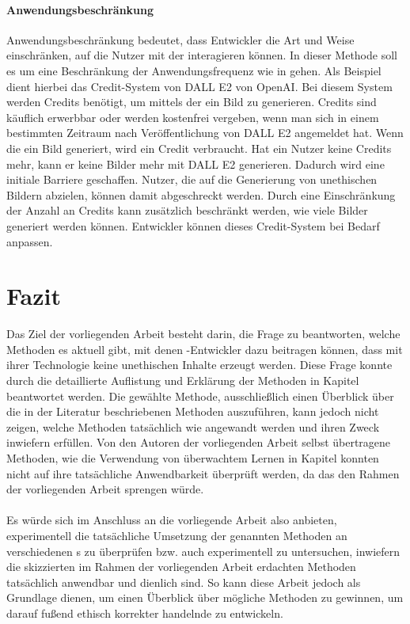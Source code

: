 \documentclass[hidelinks,12pt]{report}
\begin{document}
\subsubsection{Anwendungsbeschränkung} %
Anwendungsbeschränkung bedeutet, dass Entwickler die Art und Weise einschränken, auf die Nutzer mit der  interagieren können. In dieser Methode soll es um eine Beschränkung der Anwendungsfrequenz wie in \cite{Jang} gehen. Als Beispiel dient hierbei das Credit-System von DALL E2 von OpenAI. Bei diesem System werden Credits benötigt, um mittels der  ein Bild zu generieren. Credits sind käuflich erwerbbar oder werden kostenfrei vergeben, wenn man sich in einem bestimmten Zeitraum nach Veröffentlichung von DALL E2 angemeldet hat. Wenn die  ein Bild generiert, wird ein Credit verbraucht. Hat ein Nutzer keine Credits mehr, kann er keine Bilder mehr mit DALL E2 generieren. Dadurch wird eine initiale Barriere geschaffen. Nutzer, die auf die Generierung von unethischen Bildern abzielen, können damit abgeschreckt werden. Durch eine Einschränkung der Anzahl an Credits kann zusätzlich beschränkt werden, wie viele Bilder generiert werden können. Entwickler können dieses Credit-System bei Bedarf anpassen.

\newpage
\begingroup
\let\clearpage\relax

\chapter{Fazit}
Das Ziel der vorliegenden Arbeit besteht darin, die Frage zu beantworten, welche Methoden es aktuell gibt, mit denen -Entwickler dazu beitragen können, dass mit ihrer Technologie keine unethischen Inhalte erzeugt werden. Diese Frage konnte durch die detaillierte Auflistung und Erklärung der Methoden in Kapitel  beantwortet werden. Die gewählte Methode, ausschließlich einen Überblick über die in der Literatur beschriebenen Methoden auszuführen, kann jedoch nicht zeigen, welche Methoden tatsächlich wie angewandt werden und ihren Zweck inwiefern erfüllen. Von den Autoren der vorliegenden Arbeit selbst übertragene Methoden, wie die Verwendung von überwachtem Lernen in Kapitel  konnten nicht auf ihre tatsächliche Anwendbarkeit überprüft werden, da das den Rahmen der vorliegenden Arbeit sprengen würde.
\\\\
Es würde sich im Anschluss an die vorliegende Arbeit also anbieten, experimentell die tatsächliche Umsetzung der genannten Methoden an verschiedenen s zu überprüfen bzw. auch experimentell zu untersuchen, inwiefern die skizzierten im Rahmen der vorliegenden Arbeit erdachten Methoden tatsächlich anwendbar und dienlich sind. So kann diese Arbeit jedoch als Grundlage dienen, um einen Überblick über mögliche Methoden zu gewinnen, um darauf fußend ethisch korrekter handelnde  zu entwickeln.
\end{document}

